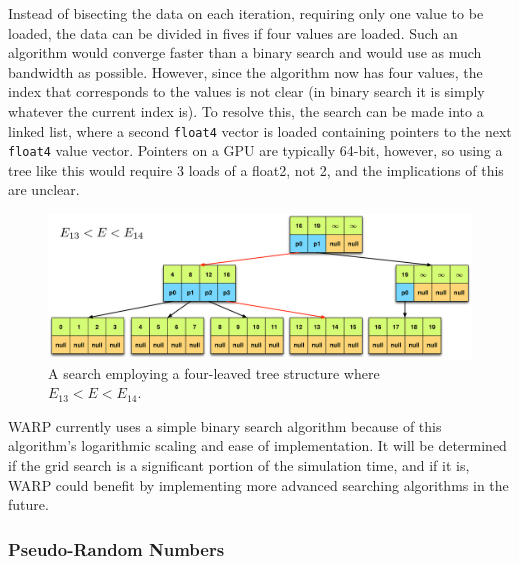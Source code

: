 Instead of bisecting the data on each iteration, requiring only one value to be loaded, the data can be divided in fives if four values are loaded.  Such an algorithm would converge faster than a binary search and would use as much bandwidth as possible.  However, since the algorithm now has four values, the index that corresponds to the values is not clear (in binary search it is simply whatever the current index is).  To resolve this, the search can be made into a linked list, where a second \lstinline{float4} vector is loaded containing pointers to the next \lstinline{float4} value vector.  Pointers on a GPU are typically 64-bit, however, so using a tree like this would require 3 loads of a float2, not 2, and the implications of this are unclear.
 

\begin{figure}[h!] 
\centering
\includegraphics[width=1.0\textwidth]{graphics/quad_tree.eps}
\caption{A search employing a four-leaved tree structure where $E_{13}<E<E_{14}$. \label{quad_tree} }%
\end{figure}

WARP currently uses a simple binary search algorithm because of this algorithm's logarithmic scaling and ease of implementation.  It will be determined if the grid search is a significant portion of the simulation time, and if it is, WARP could benefit by implementing more advanced searching algorithms in the future.

\subsubsection{Pseudo-Random Numbers}

